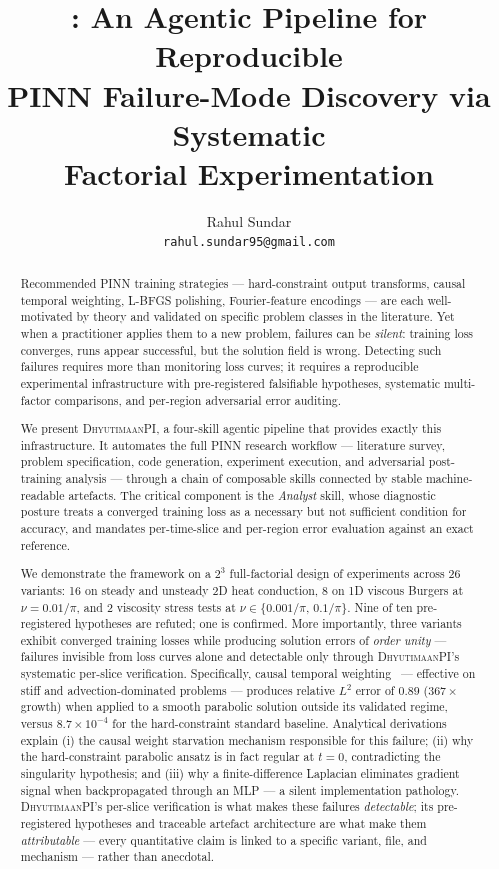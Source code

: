\documentclass{article}
\title{\dhyutimaan: An Agentic Pipeline for Reproducible\\
       PINN Failure-Mode Discovery via Systematic\\
       Factorial Experimentation}
\author{%
  Rahul Sundar\\
  \texttt{rahul.sundar95@gmail.com}
}
\newcommand{\dhyutimaan}{\textsc{DhyutimaanPI}}
\begin{document}
\maketitle

\begin{abstract}
Recommended PINN training strategies — hard-constraint output transforms,
causal temporal weighting, L-BFGS polishing, Fourier-feature encodings —
are each well-motivated by theory and validated on specific problem classes
in the literature.
Yet when a practitioner applies them to a new problem, failures can be
\emph{silent}: training loss converges, runs appear successful, but the
solution field is wrong.
Detecting such failures requires more than monitoring loss curves; it requires
a reproducible experimental infrastructure with pre-registered falsifiable
hypotheses, systematic multi-factor comparisons, and per-region adversarial
error auditing.

We present \dhyutimaan{}, a four-skill agentic pipeline that provides exactly
this infrastructure.
It automates the full PINN research workflow — literature survey, problem
specification, code generation, experiment execution, and adversarial
post-training analysis — through a chain of composable skills connected
by stable machine-readable artefacts.
The critical component is the \emph{Analyst} skill, whose diagnostic posture
treats a converged training loss as a necessary but not sufficient condition
for accuracy, and mandates per-time-slice and per-region error evaluation
against an exact reference.

We demonstrate the framework on a $2^3$ full-factorial design of experiments
across 26 variants: 16 on steady and unsteady 2D heat conduction, 8 on
1D viscous Burgers at $\nu = 0.01/\pi$, and 2 viscosity stress tests
at $\nu\in\{0.001/\pi,\,0.1/\pi\}$.
Nine of ten pre-registered hypotheses are refuted; one is confirmed.
More importantly, three variants exhibit converged training losses while
producing solution errors of \emph{order unity} — failures invisible from
loss curves alone and detectable only through \dhyutimaan{}'s systematic
per-slice verification.
Specifically, causal temporal weighting~\citep{wang2022causal} — effective
on stiff and advection-dominated problems — produces relative $L^2$ error of
$0.89$ ($367\times$ growth) when applied to a smooth parabolic solution
outside its validated regime, versus $8.7\times10^{-4}$ for the
hard-constraint standard baseline.
Analytical derivations explain (i) the causal weight starvation mechanism
responsible for this failure; (ii) why the hard-constraint parabolic ansatz
is in fact regular at $t=0$, contradicting the singularity hypothesis; and
(iii) why a finite-difference Laplacian eliminates gradient signal when
backpropagated through an MLP — a silent implementation pathology.
\dhyutimaan{}'s per-slice verification is what makes these failures \emph{detectable};
its pre-registered hypotheses and traceable artefact architecture are what make them
\emph{attributable} --- every quantitative claim is linked to a specific variant, file,
and mechanism --- rather than anecdotal.
\end{abstract}
\end{document}
